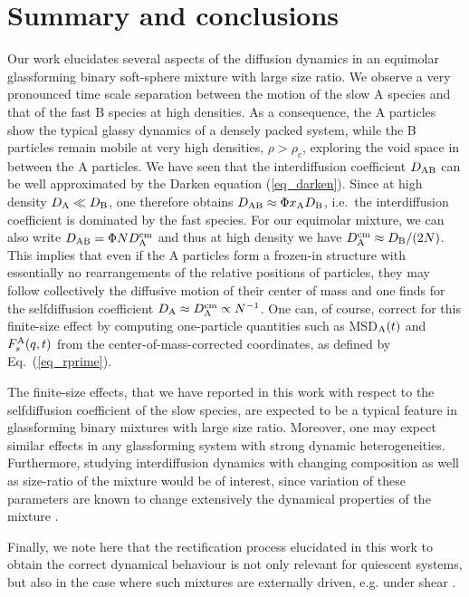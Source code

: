 %
\section{Summary and conclusions}
\label{sec4}
%
Our work elucidates several aspects of the diffusion dynamics in an equimolar glassforming binary soft-sphere mixture with large size ratio.  We observe a very pronounced time scale separation between the motion of the slow A species and that of the fast B species at high densities. As a consequence, the A particles show the typical glassy dynamics of a densely packed system, while the B particles remain mobile at very high densities, $\rho > \rho_c$, exploring the void space in between the A particles. We have seen that the interdiffusion coefficient $D_{\rm AB}$ can be well approximated by the Darken equation (\ref{eq_darken}).  Since at high density $D_{\rm A} \ll D_{\rm B}$, one therefore obtains $D_{\rm AB} \approx \Phi x_{\rm A} D_{\rm B}$, i.e.~the interdiffusion coefficient is dominated by the fast species.  For our equimolar mixture, we can also write $D_{\rm AB} = \Phi N D_{\rm A}^{\rm cm}$ and thus at high density we have $D_{\rm A}^{\rm cm} \approx D_{\rm B}/(2N)$.  This implies that even if the A particles form a frozen-in structure with essentially no rearrangements of the relative positions of particles, they may follow collectively the diffusive motion of their center of mass and one finds for the selfdiffusion coefficient $D_{\rm A} \approx D_{\rm A}^{\rm cm} \propto N^{-1}$. One can, of course, correct for this finite-size effect by computing one-particle quantities such as MSD$_{\rm A}(t)$ and $F_s^{\rm A}(q,t)$ from the center-of-mass-corrected coordinates, as defined by Eq.~(\ref{eq_rprime}).

The finite-size effects, that we have reported in this work with respect to the selfdiffusion coefficient of the slow species, are expected to be a typical feature in glassforming binary mixtures with large size ratio. Moreover, one may expect similar effects in any glassforming system with strong dynamic heterogeneities. {Furthermore, studying interdiffusion dynamics with changing composition as well as size-ratio of the mixture would be of interest, since variation of these parameters are known to change extensively the dynamical properties of the mixture \cite{zac2005, vinaySoft}}.

{Finally, we note here that the rectification process elucidated in this work to obtain the correct dynamical behaviour is not only relevant for quiescent systems, but also in the case where such mixtures are externally driven, e.g. under shear \cite{vinay}. }
%


